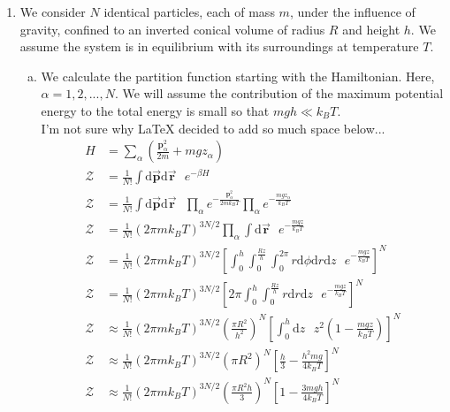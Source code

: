 \documentclass[]{book}
\begin{document}
\begin{enumerate}[1)]
\noindent\rule{15cm}{0.4pt} \\
\item We consider $N$ identical particles, each of mass $m$, under the influence of gravity, confined to an inverted conical volume of radius $R$ and height $h$. We assume the system is in equilibrium with its surroundings at temperature $T$. \\
\begin{enumerate}[a)] 
\item We calculate the partition function starting with the Hamiltonian. Here, $\alpha = 1,2,...,N$. We will assume the contribution of the maximum potential energy to the total energy is small so that $mgh \ll k_BT$. \\
I'm not sure why LaTeX decided to add so much space below... \\
\begin{equation}
\begin{split}
H & = \sum_\alpha \left(\frac{\textbf{p}^2_\alpha}{2m} + mgz_\alpha\right) \\
\mathcal{Z} & = \frac{1}{N!}\int \text{d}\vec{\textbf{p}} \text{d}\vec{\textbf{r}} \text{ } e^{-\beta H} \\
\mathcal{Z} & = \frac{1}{N!}\int \text{d}\vec{\textbf{p}} \text{d}\vec{\textbf{r}} \text{ } \prod_{\alpha}e^{-\frac{\textbf{p}^2_\alpha}{2mk_BT} } \prod_\alpha e^{-\frac{mgz_\alpha}{k_BT}}\\
\mathcal{Z} & = \frac{1}{N!}\left(2\pi m k_BT\right)^{3N/2} \prod_\alpha \int \text{d}\vec{\textbf{r}} \text{ } e^{-\frac{mgz}{k_BT}} \\
\mathcal{Z} & = \frac{1}{N!}\left(2\pi m k_BT\right)^{3N/2} \left[ \int_{0}^{h}\int_{0}^{\frac{Rz}{h}}\int_{0}^{2\pi} r\text{d}\phi \text{d}r \text{d}z \text{ } e^{-\frac{mgz}{k_BT}} \right]^N \\
\mathcal{Z} & = \frac{1}{N!}\left(2\pi m k_BT\right)^{3N/2} \left[2\pi \int_{0}^{h}\int_{0}^{\frac{Rz}{h}} r \text{d}r \text{d}z \text{ } e^{-\frac{mgz}{k_BT}} \right]^N \\
\mathcal{Z} & \approx \frac{1}{N!}\left(2\pi m k_BT\right)^{3N/2} \left(\frac{\pi R^2}{h^2}\right)^N  \left[\int_{0}^{h}  \text{d}z \text{ }z^2 \left( 1-\frac{mgz}{k_BT} \right) \right]^N \\
\mathcal{Z} & \approx \frac{1}{N!}\left(2\pi m k_BT\right)^{3N/2} \left(\pi R^2\right)^N  \left[ \frac{h}{3} - \frac{h^2mg}{4k_BT} \right]^N \\
\mathcal{Z} & \approx \frac{1}{N!}\left(2\pi m k_BT\right)^{3N/2} \left(\frac{\pi R^2h}{3}\right)^N  \left[ 1 - \frac{3mgh}{4k_BT} \right]^N \\

\end{split}
\end{equation}
\end{enumerate}
\end{enumerate}
\end{document}
